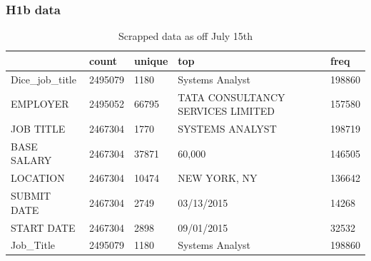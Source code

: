 \documentclass[10pt,mathserif]{beamer}
\begin{document}
	\begin{frame}
	\frametitle{H1b data}
	\begin{table}[h]
	\caption{Scrapped data as off July 15th}
	\resizebox{\columnwidth}{!}
	{%
		\begin{tabular}{lllll}
			\hline
			{} &    count & unique &                                                top &    freq \\
			\hline
			Dice\_job\_title &  2495079 &   1180 &                                    Systems Analyst &  198860 \\
			EMPLOYER       &  2495052 &  66795 &                  TATA CONSULTANCY SERVICES LIMITED &  157580 \\
			JOB TITLE      &  2467304 &   1770 &                                    SYSTEMS ANALYST &  198719 \\
			BASE SALARY    &  2467304 &  37871 &                                             60,000 &  146505 \\
			LOCATION       &  2467304 &  10474 &                                       NEW YORK, NY &  136642 \\
			SUBMIT DATE    &  2467304 &   2749 &                                         03/13/2015 &   14268 \\
			START DATE     &  2467304 &   2898 &                                         09/01/2015 &   32532 \\
			Job\_Title      &  2495079 &   1180 &                                    Systems Analyst &  198860 \\
			\hline
		\end{tabular}
	}
\end{table}

\end{frame}
\end{document}
